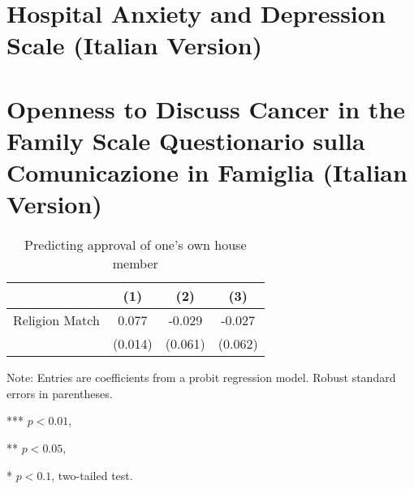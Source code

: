 \section{Hospital Anxiety and Depression Scale (Italian Version)}

\section{Openness to Discuss Cancer in the Family Scale Questionario sulla Comunicazione in Famiglia (Italian Version)}

\begin{table}[hbt!]
\centering
\begin{threeparttable}
\caption{Predicting approval of one's own house member}\label{tab:predictapproval}
\begin{tabular}{lSSS}
  \toprule
   & {(1)} & {(2)} & {(3)} \\
   \midrule
   Religion Match & 0.077\tnote{***} & -0.029 & -0.027 \\
                  & {(0.014)} & {(0.061)} & {(0.062)} \\
   \bottomrule
\end{tabular}
\begin{tablenotes}[para]
  \item[]Note: Entries are coefficients from a probit regression model. Robust standard errors in parentheses.
  \item[***] $p < 0.01$,
  \item[**] $p < 0.05$,
  \item[*] $p < 0.1$, two-tailed test.
\end{tablenotes}
\end{threeparttable}
\end{table}
